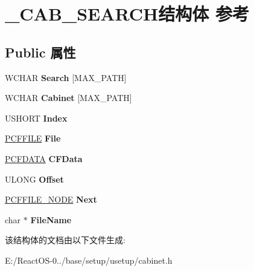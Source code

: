 \hypertarget{struct___c_a_b___s_e_a_r_c_h}{}\section{\+\_\+\+C\+A\+B\+\_\+\+S\+E\+A\+R\+C\+H结构体 参考}
\label{struct___c_a_b___s_e_a_r_c_h}
\subsection*{Public 属性}
\begin{DoxyCompactItemize}
\item 
\mbox{\label{struct___c_a_b___s_e_a_r_c_h_a8221bd99f6bf1256bcf3ef1cf61c864e}} 
W\+C\+H\+AR {\bfseries Search} \mbox{[}M\+A\+X\+\_\+\+P\+A\+TH\mbox{]}
\item 
\mbox{\label{struct___c_a_b___s_e_a_r_c_h_af1dfb8cdefacfbd0d7f98cae2a18283f}} 
W\+C\+H\+AR {\bfseries Cabinet} \mbox{[}M\+A\+X\+\_\+\+P\+A\+TH\mbox{]}
\item 
\mbox{\label{struct___c_a_b___s_e_a_r_c_h_a71138ee53dfacfb0c505462ba5fb728a}} 
U\+S\+H\+O\+RT {\bfseries Index}
\item 
\mbox{\label{struct___c_a_b___s_e_a_r_c_h_afd0d55004754366025f947d793d2c174}} 
\hyperlink{struct___c_f_f_i_l_e}{P\+C\+F\+F\+I\+LE} {\bfseries File}
\item 
\mbox{\label{struct___c_a_b___s_e_a_r_c_h_ab33423fa4506c3cec634d45b0e9e6a83}} 
\hyperlink{struct___c_f_d_a_t_a}{P\+C\+F\+D\+A\+TA} {\bfseries C\+F\+Data}
\item 
\mbox{\label{struct___c_a_b___s_e_a_r_c_h_a37bf7222e2a1e1279f3ad3f77ac1dcc3}} 
U\+L\+O\+NG {\bfseries Offset}
\item 
\mbox{\label{struct___c_a_b___s_e_a_r_c_h_a76ae552998bf4c9d5d602dd1c4d77613}} 
\hyperlink{struct___c_f_f_i_l_e___n_o_d_e}{P\+C\+F\+F\+I\+L\+E\+\_\+\+N\+O\+DE} {\bfseries Next}
\item 
\mbox{\label{struct___c_a_b___s_e_a_r_c_h_a31445ae1324d4567255dd4c8a41ed0e5}} 
char $\ast$ {\bfseries File\+Name}
\end{DoxyCompactItemize}


该结构体的文档由以下文件生成\+:\begin{DoxyCompactItemize}
\item 
E\+:/\+React\+O\+S-\/0../base/setup/usetup/cabinet.\+h\end{DoxyCompactItemize}
